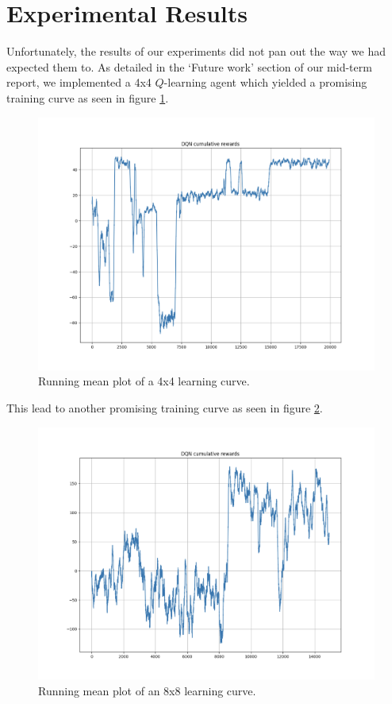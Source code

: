 \documentclass{article}
\begin{document}
\section{\label{doc:exp_results}Experimental Results}
Unfortunately, the results of our experiments did not pan out the way we had expected them to. As detailed in the `Future work' section of our mid-term report, we implemented a 4x4 $Q$-learning agent which yielded a promising training curve as seen in figure \ref{fig:4x4_curve}.
\begin{figure}[ht]
\centering
\includegraphics[width=0.9\linewidth]{figures/4x4_model_cumulative_rewards_curve.png}
\caption{\label{fig:4x4_curve}Running mean plot of a 4x4 learning curve.}
\end{figure}
This lead to another promising training curve as seen in figure \ref{fig:8x8_good_curve}.
\begin{figure}[ht]
    \centering
    \includegraphics[width=0.9\linewidth]{figures/8x8_model_cumulative_reward_curve.png}
    \caption{\label{fig:8x8_good_curve}Running mean plot of an 8x8 learning curve.}
\end{figure}
\end{document}
